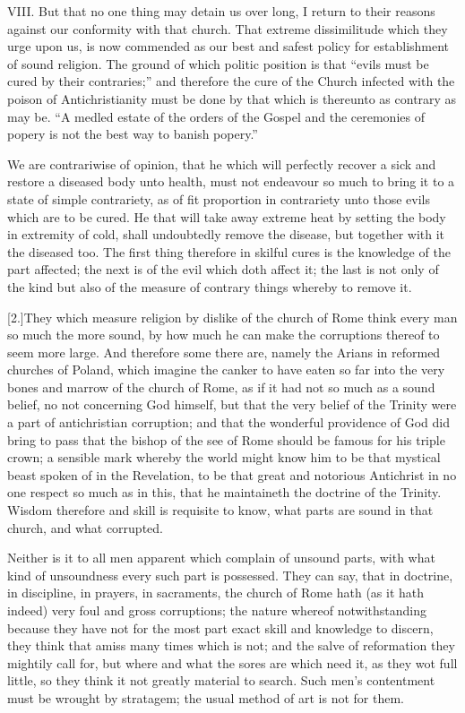 VIII. But that no one thing may detain us over long, I return to their reasons against our conformity with that church. That extreme dissimilitude which they urge upon us, is now commended as our best and safest policy for establishment of sound religion. The ground of which politic position is that “evils must be cured by their contraries;” and therefore the cure of the Church infected with the poison of Antichristianity must be done by that which is thereunto as contrary as may be. “A medled estate of the orders of the Gospel and the ceremonies of popery is not the best way to banish popery.”

We are contrariwise of opinion, that he which will perfectly recover a sick and restore a diseased body unto health, must not endeavour so much to bring it to a state of simple contrariety, as of fit proportion in contrariety unto those evils which are to be cured. He that will take away extreme heat by setting the body in extremity of cold, shall undoubtedly remove the disease, but together with it the diseased too. The first thing therefore in skilful cures is the knowledge of the part affected; the next is of the evil which doth affect it; the last is not only of the kind but also of the measure of contrary things whereby to remove it.


[2.]They which measure religion by dislike of the church of Rome think every man so much the more sound, by how much he can make the corruptions thereof to seem more large. And therefore some there are, namely the Arians in reformed churches of Poland, which imagine the canker to have eaten so far into the very bones and marrow of the church of Rome, as if it had not so much as a sound belief, no not concerning God himself, but that the very belief of the Trinity were a part of antichristian corruption; and that the wonderful providence of God did bring to pass that the bishop of the see of Rome should be famous for his triple crown; a sensible mark whereby the world might know him to be that mystical beast spoken of in the Revelation, to be that great and notorious Antichrist in no one respect so much as in this, that he maintaineth the doctrine of the Trinity. Wisdom therefore and skill is requisite to know, what parts are sound in that church, and what corrupted.

Neither is it to all men apparent which complain of unsound parts, with what kind of unsoundness every such part is possessed. They can say, that in doctrine, in discipline, in prayers, in sacraments, the church of Rome hath (as it hath indeed) very foul and gross corruptions; the nature whereof notwithstanding because they have not for the most part exact skill and knowledge to discern, they think that amiss many times which is not; and the salve of reformation they mightily call for, but where and what the sores are which need it, as they wot full little, so they think it not greatly material to search. Such men’s contentment must be wrought by stratagem; the usual method of art is not for them.

